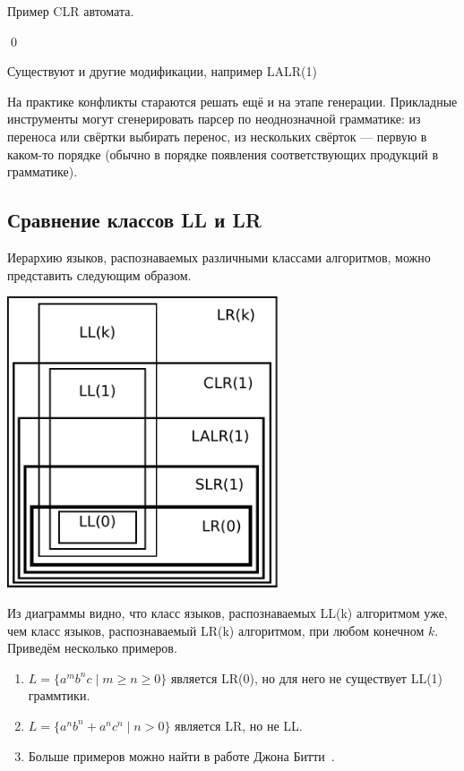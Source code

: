 \begin{example}
Пример CLR автомата.

\begin{center}
  
\end{center}
\qed
\end{example}


Существуют и другие модификации, например LALR(1)

На практике конфликты стараются решать ещё и на этапе генерации.
Прикладные инструменты могут сгенерировать парсер по неоднозначной грамматике: из переноса или свёртки выбирать перенос, из нескольких свёрток --- первую в каком-то порядке (обычно в порядке появления соответствующих продукций в грамматике).

\subsection{Сравнение классов LL и LR}

Иерархию языков, распознаваемых различными классами алгоритмов, можно представить следующим образом.
\begin{center}
\includegraphics[width=0.6\textwidth]{pics/LL_LR.pdf}
\end{center}

Из диаграммы видно, что класс языков, распознаваемых LL(k) алгоритмом уже, чем класс языков, распознаваемый LR(k) алгоритмом, при любом конечном $k$. Приведём несколько примеров.
\begin{enumerate}
\item $L = \{a^mb^nc \mid m \geq n \geq 0\} $ является LR(0), но для него не существует LL(1) граммтики.
\item $L = \{ a^n b^n + a^n c^n \mid n > 0\}$ является LR, но не LL.
\item Больше примеров можно найти в работе Джона Битти~\cite{BEATTY1980193}.
\end{enumerate}


